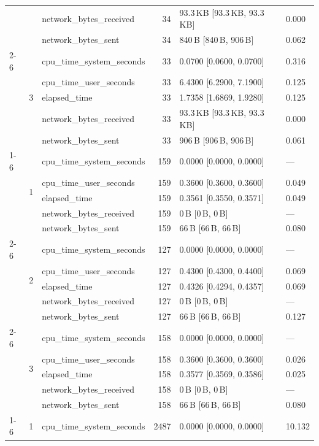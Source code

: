 \begin{tabular}{lllrll}
 &  & network_bytes_received & 34 & 93.3\,KB [93.3\,KB, 93.3\,KB] & 0.000 \\
 &  & network_bytes_sent & 34 & 840\,B [840\,B, 906\,B] & 0.062 \\
\cline{2-6}
 & \multirow[t]{5}{*}{3} & cpu_time_system_seconds & 33 & 0.0700 [0.0600, 0.0700] & 0.316 \\
 &  & cpu_time_user_seconds & 33 & 6.4300 [6.2900, 7.1900] & 0.125 \\
 &  & elapsed_time & 33 & 1.7358 [1.6869, 1.9280] & 0.125 \\
 &  & network_bytes_received & 33 & 93.3\,KB [93.3\,KB, 93.3\,KB] & 0.000 \\
 &  & network_bytes_sent & 33 & 906\,B [906\,B, 906\,B] & 0.061 \\
\cline{1-6} \cline{2-6}
\multirow[t]{15}{*}{point-in-polygon-lookup-local-small} & \multirow[t]{5}{*}{1} & cpu_time_system_seconds & 159 & 0.0000 [0.0000, 0.0000] & --- \\
 &  & cpu_time_user_seconds & 159 & 0.3600 [0.3600, 0.3600] & 0.049 \\
 &  & elapsed_time & 159 & 0.3561 [0.3550, 0.3571] & 0.049 \\
 &  & network_bytes_received & 159 & 0\,B [0\,B, 0\,B] & --- \\
 &  & network_bytes_sent & 159 & 66\,B [66\,B, 66\,B] & 0.080 \\
\cline{2-6}
 & \multirow[t]{5}{*}{2} & cpu_time_system_seconds & 127 & 0.0000 [0.0000, 0.0000] & --- \\
 &  & cpu_time_user_seconds & 127 & 0.4300 [0.4300, 0.4400] & 0.069 \\
 &  & elapsed_time & 127 & 0.4326 [0.4294, 0.4357] & 0.069 \\
 &  & network_bytes_received & 127 & 0\,B [0\,B, 0\,B] & --- \\
 &  & network_bytes_sent & 127 & 66\,B [66\,B, 66\,B] & 0.127 \\
\cline{2-6}
 & \multirow[t]{5}{*}{3} & cpu_time_system_seconds & 158 & 0.0000 [0.0000, 0.0000] & --- \\
 &  & cpu_time_user_seconds & 158 & 0.3600 [0.3600, 0.3600] & 0.026 \\
 &  & elapsed_time & 158 & 0.3577 [0.3569, 0.3586] & 0.025 \\
 &  & network_bytes_received & 158 & 0\,B [0\,B, 0\,B] & --- \\
 &  & network_bytes_sent & 158 & 66\,B [66\,B, 66\,B] & 0.080 \\
\cline{1-6} \cline{2-6}
\multirow[t]{15}{*}{point-in-polygon-lookup-postgis-large} & \multirow[t]{5}{*}{1} & cpu_time_system_seconds & 2487 & 0.0000 [0.0000, 0.0000] & 10.132 \\

\end{tabular}
